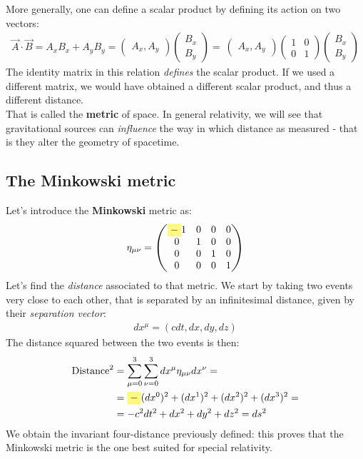 \documentclass[../template.tex]{subfiles}
\begin{document}
More generally, one can define a scalar product by defining its action on two vectors:
\begin{align*}
\vec{A} \cdot \vec{B} = A_x B_x + A_y B_y = \begin{pmatrix}A_x, A_y\end{pmatrix}\begin{pmatrix}B_x\\B_y\end{pmatrix} =\ \begin{pmatrix}A_x, A_y\end{pmatrix}\begin{pmatrix}1 & 0\\ 0&1\end{pmatrix}\begin{pmatrix}B_x\\B_y\end{pmatrix}
\end{align*}
The identity matrix in this relation \textit{defines} the scalar product. If we used a different matrix, we would have obtained a different scalar product, and thus a different distance.\\
That  is called the \textbf{metric} of space. In general relativity, we will see that gravitational sources can \textit{influence} the way in which distance as measured - that is they alter the geometry of spacetime.\\

\subsection{The Minkowski metric}
Let's introduce the \textbf{Minkowski} metric as:
\begin{align*}
\eta_{\mu\nu}=\begin{pmatrix}\hlc{Yellow}{-}1 & 0 & 0 & 0\\
0 & 1 & 0 & 0\\
0 & 0 & 1 & 0\\
0 & 0 & 0 & 1
\end{pmatrix}
\end{align*}
Let's find the \textit{distance} associated to that metric. We start by taking two events very close to each other, that is separated by an infinitesimal distance, given by their \textit{separation vector}:
\begin{align*}
dx^\mu = (cdt, dx, dy, dz)
\end{align*}
The distance squared between the two events is then:
\begin{align*}
\mathrm{Distance}^2 &= \sum_{\mu=0}^3 \sum_{\nu=0}^3 dx^\mu \eta_{\mu\nu} dx^\nu =\\
&= \hlc{Yellow}{-}(dx^0)^2 + (dx^1)^2 + (dx^2)^2 + (dx^3)^2 =\\
&= -c^2dt^2 + dx^2 + dy^2 + dz^2 = ds^2
\end{align*}
We obtain the invariant four-distance previously defined: this proves that the Minkowski metric is the one best suited for special relativity.
\end{document}
